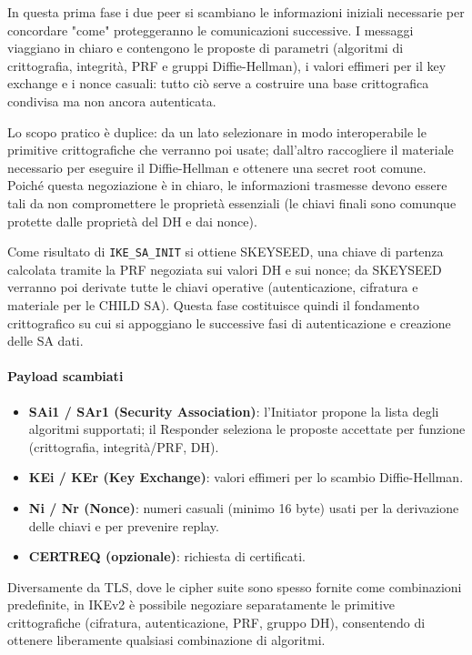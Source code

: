 \documentclass[a4paper, 11pt]{article}
\begin{document}
In questa prima fase i due peer si scambiano le informazioni iniziali necessarie per concordare "come" proteggeranno le comunicazioni successive. I messaggi viaggiano in chiaro e contengono le proposte di parametri (algoritmi di crittografia, integrità, PRF e gruppi Diffie-Hellman), i valori effimeri per il key exchange e i nonce casuali: tutto ciò serve a costruire una base crittografica condivisa ma non ancora autenticata. 

Lo scopo pratico è duplice: da un lato selezionare in modo interoperabile le primitive crittografiche che verranno poi usate; dall'altro raccogliere il materiale  necessario per eseguire il Diffie-Hellman e ottenere una secret root comune. Poiché questa negoziazione è in chiaro, le informazioni trasmesse devono essere tali da non compromettere le proprietà essenziali (le chiavi finali sono comunque protette dalle proprietà del DH e dai nonce).

Come risultato di \texttt{IKE\_SA\_INIT} si ottiene SKEYSEED, una chiave di partenza calcolata tramite la PRF negoziata sui valori DH e sui nonce; da SKEYSEED verranno poi derivate tutte le chiavi operative (autenticazione, cifratura e materiale per le CHILD SA). Questa fase costituisce quindi il fondamento crittografico su cui si appoggiano le successive fasi di autenticazione e creazione delle SA dati.

\paragraph{Payload scambiati}
\begin{itemize}
    \item \textbf{SAi1 / SAr1 (Security Association)}: l'Initiator propone la lista degli algoritmi supportati; il Responder seleziona le proposte accettate per funzione (crittografia, integrità/PRF, DH).
    \item \textbf{KEi / KEr (Key Exchange)}: valori effimeri per lo scambio Diffie-Hellman.
    \item \textbf{Ni / Nr (Nonce)}: numeri casuali (minimo 16 byte) usati per la derivazione delle chiavi e per prevenire replay.
    \item \textbf{CERTREQ (opzionale)}: richiesta di certificati.
\end{itemize}

\begin{tcolorbox}[colback=blue!5,colframe=blue!40!black,title=Nota]
Diversamente da TLS, dove le cipher suite sono spesso fornite come combinazioni predefinite, in IKEv2 è possibile negoziare separatamente le primitive crittografiche (cifratura, autenticazione, PRF, gruppo DH), consentendo di ottenere liberamente qualsiasi combinazione di algoritmi.
\end{tcolorbox}
\end{document}
